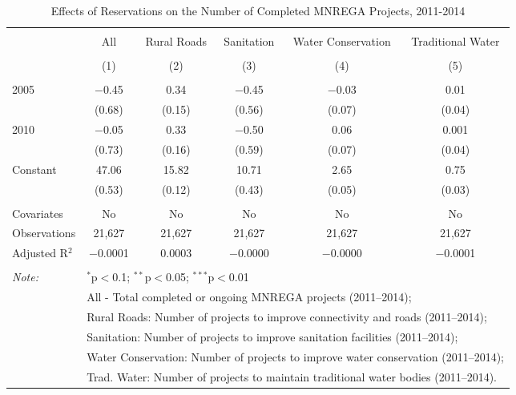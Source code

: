 
\begin{table}[!htbp] \centering 
  \caption{Effects of Reservations on the Number of Completed MNREGA Projects, 2011-2014} 
  \label{} 
\scriptsize 
\begin{tabular}{@{\extracolsep{5pt}}lccccc} 
\\[-1.8ex]\hline 
\hline \\[-1.8ex] 
 & All & Rural Roads & Sanitation & Water Conservation & Traditional Water \\ 
\\[-1.8ex] & (1) & (2) & (3) & (4) & (5)\\ 
\hline \\[-1.8ex] 
 2005 & $-$0.45 & 0.34 & $-$0.45 & $-$0.03 & 0.01 \\ 
  & (0.68) & (0.15) & (0.56) & (0.07) & (0.04) \\ 
  2010 & $-$0.05 & 0.33 & $-$0.50 & 0.06 & 0.001 \\ 
  & (0.73) & (0.16) & (0.59) & (0.07) & (0.04) \\ 
  Constant & 47.06 & 15.82 & 10.71 & 2.65 & 0.75 \\ 
  & (0.53) & (0.12) & (0.43) & (0.05) & (0.03) \\ 
 \hline \\[-1.8ex] 
Covariates & No & No & No & No & No \\ 
Observations & 21,627 & 21,627 & 21,627 & 21,627 & 21,627 \\ 
Adjusted R$^{2}$ & $-$0.0001 & 0.0003 & $-$0.0000 & $-$0.0000 & $-$0.0001 \\ 
\hline 
\hline \\[-1.8ex] 
\textit{Note:}  & \multicolumn{5}{l}{$^{*}$p$<$0.1; $^{**}$p$<$0.05; $^{***}$p$<$0.01} \\ 
 & \multicolumn{5}{l}{All - Total completed or ongoing MNREGA projects (2011--2014);} \\ 
 & \multicolumn{5}{l}{Rural Roads: Number of projects to improve connectivity and roads (2011--2014);} \\ 
 & \multicolumn{5}{l}{Sanitation:  Number of projects to improve sanitation facilities  (2011--2014);} \\ 
 & \multicolumn{5}{l}{Water Conservation: Number of projects to improve water conservation (2011--2014);} \\ 
 & \multicolumn{5}{l}{Trad. Water: Number of projects to maintain traditional water bodies (2011--2014).} \\ 
\end{tabular} 
\end{table} 
